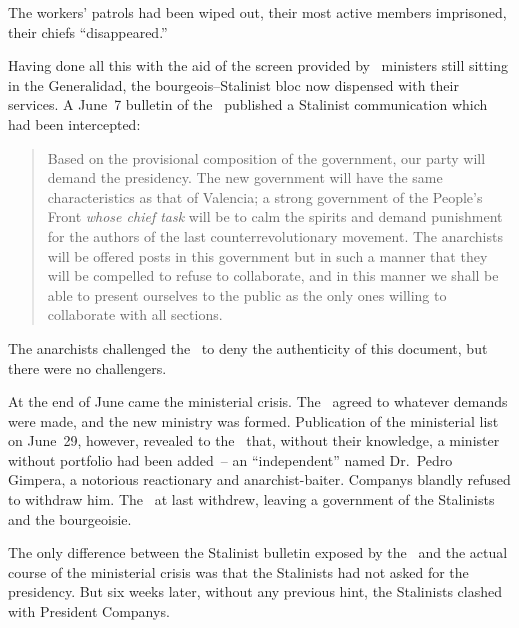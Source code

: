 The workers’ patrols had been wiped out, their most active members imprisoned, their chiefs ``disappeared.''

Having done all this with the aid of the screen provided by \CNT\ ministers still sitting in the Generalidad, the bourgeois--Stalinist bloc now dispensed with their services.
A June~7 bulletin of the \FAI\ published a Stalinist communication which had been intercepted:\indexCNT

\begin{quotation}
  Based on the provisional composition of the government, our party will demand the presidency. The new government will have the same characteristics as that of Valencia; a strong government of the People’s Front \emph{whose chief task} will be to calm the spirits and demand punishment for the authors of the last counterrevolutionary movement. The anarchists will be offered posts in this government but in such a manner that they will be compelled to refuse to collaborate, and in this manner we shall be able to present ourselves to the public as the only ones willing to collaborate with all sections.
\end{quotation}

The anarchists challenged the \PSUC\ to deny the authenticity of this document, but there were no challengers.

At the end of June came the ministerial crisis. The \CNT\ agreed to whatever demands were made, and the new ministry was formed. Publication of the ministerial list on June~29, however\kn, revealed to the \CNT\ that, without their knowledge, a minister without portfolio had been added~-- an ``independent'' named Dr.~Pedro Gimpera, a notorious reactionary and anarchist-baiter. Companys blandly refused to withdraw him. The \CNT\ at last withdrew, leaving a government of the Stalinists and the bourgeoisie. {\indexCNT}

The only difference between the Stalinist bulletin exposed by the \FAI\ and the actual course of the ministerial crisis was that the Stalinists had not asked for the presidency. But six weeks later\kn, without any previous hint, the Stalinists clashed with President Companys.

